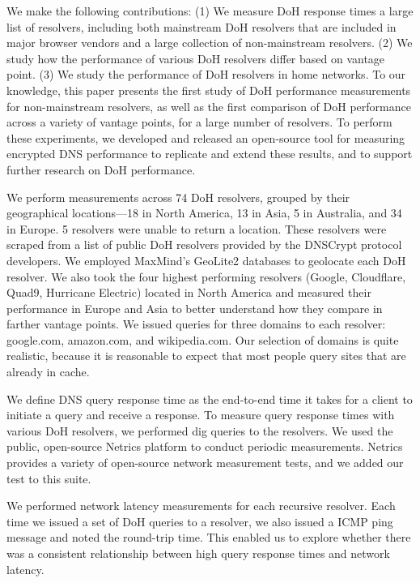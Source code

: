 We make the following contributions: (1) We measure DoH response times a large list of resolvers, including both mainstream DoH resolvers that are included in major browser vendors and a large collection of non-mainstream resolvers. (2) We study how the performance of various DoH resolvers differ based on vantage point. (3) We study the performance of DoH resolvers in home networks. To our knowledge, this paper presents the first study of DoH performance measurements for non-mainstream resolvers, as well as the first comparison of DoH performance across a variety of vantage points, for a large number of resolvers. To perform these experiments, we developed and released an open-source tool for measuring encrypted DNS performance to replicate and extend these results, and to support further research on DoH performance.

We perform measurements across 74 DoH resolvers, grouped by their geographical locations—18 in North America, 13 in Asia, 5 in Australia, and 34 in Europe. 5 resolvers were unable to return a location. These resolvers were scraped from a list of public DoH resolvers provided by the DNSCrypt protocol developers. We employed MaxMind’s GeoLite2 databases to geolocate each DoH resolver. We also took the four highest performing resolvers (Google, Cloudflare, Quad9, Hurricane Electric) located in North America and measured their performance in Europe and Asia to better understand how they compare in farther vantage points. We issued queries for three domains to each resolver: google.com, amazon.com, and wikipedia.com. Our selection of domains is quite realistic, because it is reasonable to expect that most people query sites that are already in cache. 

We define DNS query response time as the
end-to-end time it takes for a client to initiate a query and receive a
response.  To measure query response times with various DoH resolvers, we
performed dig queries to the resolvers. We used the public, open-source Netrics
platform to conduct periodic measurements. Netrics
provides a variety of open-source network measurement tests, and we added our 
test to this suite. 

We performed network latency measurements for each recursive resolver.  Each time
we issued a set of DoH queries to a resolver, we also issued a ICMP ping
message and noted the round-trip time.  This enabled us to explore
whether there was a consistent relationship between high query response times
and network latency.


